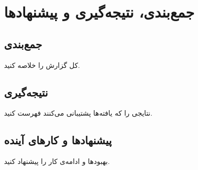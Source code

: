 \chapter{جمع‌بندی، نتیجه‌گیری و پیشنهادها}\label{ch:conclusion}

\section{جمع‌بندی}
کل گزارش را خلاصه کنید.

\section{نتیجه‌گیری}
نتایجی را که یافته‌ها پشتیبانی می‌کنند فهرست کنید.

\section{پیشنهادها و کارهای آینده}
بهبودها و ادامه‌ی کار را پیشنهاد کنید.
